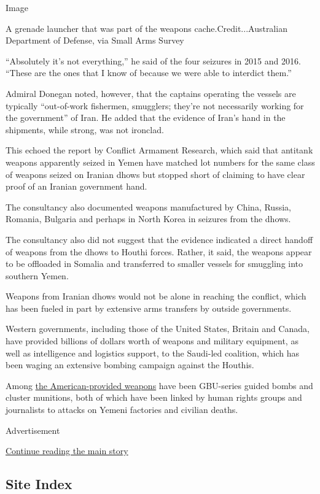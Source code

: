 Image

A grenade launcher that was part of the weapons
cache.Credit...Australian Department of Defense, via Small Arms Survey

``Absolutely it's not everything,'' he said of the four seizures in 2015
and 2016. ``These are the ones that I know of because we were able to
interdict them.''

Admiral Donegan noted, however, that the captains operating the vessels
are typically ``out-of-work fishermen, smugglers; they're not
necessarily working for the government'' of Iran. He added that the
evidence of Iran's hand in the shipments, while strong, was not
ironclad.

This echoed the report by Conflict Armament Research, which said that
antitank weapons apparently seized in Yemen have matched lot numbers for
the same class of weapons seized on Iranian dhows but stopped short of
claiming to have clear proof of an Iranian government hand.

The consultancy also documented weapons manufactured by China, Russia,
Romania, Bulgaria and perhaps in North Korea in seizures from the dhows.

The consultancy also did not suggest that the evidence indicated a
direct handoff of weapons from the dhows to Houthi forces. Rather, it
said, the weapons appear to be offloaded in Somalia and transferred to
smaller vessels for smuggling into southern Yemen.

Weapons from Iranian dhows would not be alone in reaching the conflict,
which has been fueled in part by extensive arms transfers by outside
governments.

Western governments, including those of the United States, Britain and
Canada, have provided billions of dollars worth of weapons and military
equipment, as well as intelligence and logistics support, to the
Saudi-led coalition, which has been waging an extensive bombing campaign
against the Houthis.

Among
\href{https://www.nytimes.com/2016/11/14/world/middleeast/yemen-saudi-bombing-houthis-hunger.html?_r=0}{the
American-provided weapons} have been GBU-series guided bombs and cluster
munitions, both of which have been linked by human rights groups and
journalists to attacks on Yemeni factories and civilian deaths.

Advertisement

\protect\hyperlink{after-bottom}{Continue reading the main story}

\hypertarget{site-index}{%
\subsection{Site Index}\label{site-index}}

